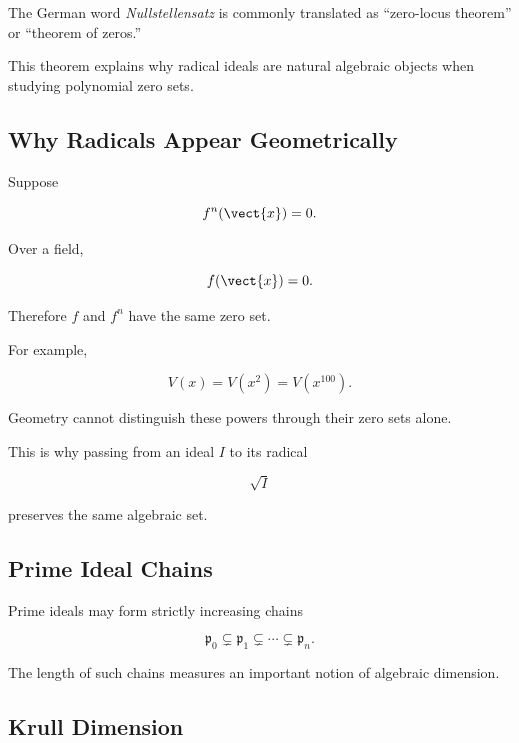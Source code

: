 The German word \emph{Nullstellensatz} is commonly translated as
``zero-locus theorem'' or ``theorem of zeros.''

This theorem explains why radical ideals are natural algebraic objects when
studying polynomial zero sets.

\subsection{Why Radicals Appear Geometrically}
\label{subsec:why-radicals-geometric}

Suppose

\[ f^n(\vect{x})=0. \]

Over a field,

\[ f(\vect{x})=0. \]

Therefore \(f\) and \(f^n\) have the same zero set.

For example,

\[ V(x)=V(x^2)=V(x^{100}). \]

Geometry cannot distinguish these powers through their zero sets alone.

This is why passing from an ideal \(I\) to its radical

\[ \sqrt{I} \]

preserves the same algebraic set.

\subsection{Prime Ideal Chains}
\label{subsec:prime-ideal-chains}

Prime ideals may form strictly increasing chains

\[ \mathfrak p_0\subsetneq\mathfrak p_1\subsetneq\cdots\subsetneq\mathfrak p_n. \]

The length of such chains measures an important notion of algebraic
dimension.

\subsection{Krull Dimension}
\label{subsec:krull-dimension}

